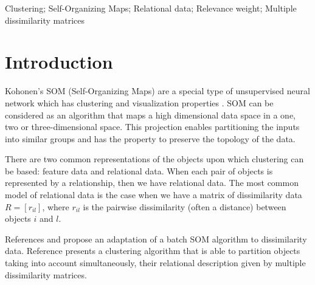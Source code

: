 \documentclass[10pt, conference, compsocconf]{IEEEtran}
\begin{document}
\begin{IEEEkeywords}
Clustering; Self-Organizing Maps; Relational data; Relevance weight; Multiple dissimilarity matrices

\end{IEEEkeywords}


%
\IEEEpeerreviewmaketitle



\section{Introduction}

Kohonen's SOM (Self-Organizing Maps) are a special type of unsupervised neural network which has clustering and visualization properties \cite{Gopalakrishnan:2008}. SOM can be considered as an algorithm that maps a high dimensional data space in a one, two or three-dimensional space. This projection enables partitioning the inputs into similar groups and has the property to preserve the topology of the data.

There are two common representations of the objects upon which clustering can be based: feature data and relational data. 
When each pair of objects is represented by a relationship, then we have relational data. The most common model of relational data is the case when we have a matrix of dissimilarity data $R = [r_{il}]$, where $r_{il}$ is the pairwise dissimilarity (often a distance) between objects $i$ and $l$.

References \cite{golli:2004} and \cite{Conan-Guez:2006} propose an adaptation of a batch SOM algorithm to dissimilarity data. Reference \cite{DeCarvalho:2011} presents a clustering algorithm that is able to partition objects taking into account simultaneously, their relational description given by multiple dissimilarity matrices.
\end{document}
